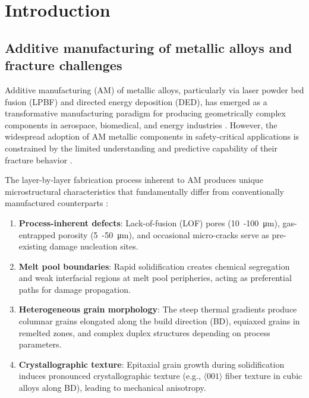 \documentclass[twocolumn]{sagej}
\begin{document}
\maketitle

\section{Introduction}

\subsection{Additive manufacturing of metallic alloys and fracture challenges}

Additive manufacturing (AM) of metallic alloys, particularly via laser powder bed fusion (LPBF) and directed energy deposition (DED), has emerged as a transformative manufacturing paradigm for producing geometrically complex components in aerospace, biomedical, and energy industries \cite{debroy2018additive,herzog2016additive}. However, the widespread adoption of AM metallic components in safety-critical applications is constrained by the limited understanding and predictive capability of their fracture behavior \cite{seifi2017overview}.

The layer-by-layer fabrication process inherent to AM produces unique microstructural characteristics that fundamentally differ from conventionally manufactured counterparts \cite{thijs2010study,suryawanshi2017mechanical}:

\begin{enumerate}\def\labelenumi{(\roman{enumi})}
    \item \textbf{Process-inherent defects}: Lack-of-fusion (LOF) pores (\SI{10}{-}\SI{100}{\micro\meter}), gas-entrapped porosity (\SI{5}{-}\SI{50}{\micro\meter}), and occasional micro-cracks serve as pre-existing damage nucleation sites.
    \item \textbf{Melt pool boundaries}: Rapid solidification creates chemical segregation and weak interfacial regions at melt pool peripheries, acting as preferential paths for damage propagation.
    \item \textbf{Heterogeneous grain morphology}: The steep thermal gradients produce columnar grains elongated along the build direction (BD), equiaxed grains in remelted zones, and complex duplex structures depending on process parameters.
    \item \textbf{Crystallographic texture}: Epitaxial grain growth during solidification induces pronounced crystallographic texture (e.g., $\langle001\rangle$ fiber texture in cubic alloys along BD), leading to mechanical anisotropy.
\end{enumerate}
\end{document}
